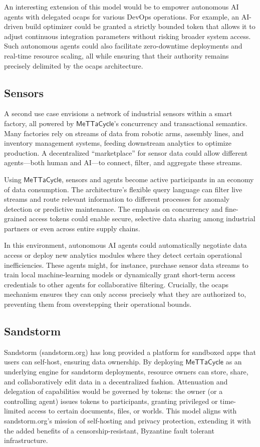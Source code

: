 \documentclass{article}
\newcommand{\MC}{\mathsf{MeTTaCycle}}
\begin{document}
An interesting extension of this model would be to empower autonomous AI agents with delegated ocaps for various DevOps operations. For example, an AI-driven build optimizer could be granted a strictly bounded token that allows it to adjust continuous integration parameters without risking broader system access. Such autonomous agents could also facilitate zero-downtime deployments and real-time resource scaling, all while ensuring that their authority remains precisely delimited by the ocaps architecture.

\subsection{Sensors}

A second use case envisions a network of industrial sensors within a smart factory, all powered by $\MC$'s concurrency and transactional semantics. Many factories rely on streams of data from robotic arms, assembly lines, and inventory management systems, feeding downstream analytics to optimize production. A decentralized “marketplace” for sensor data could allow different agents---both human and AI---to connect, filter, and aggregate these streams.

Using $\MC$, sensors and agents become active participants in an economy of data consumption. The architecture’s flexible query language can filter live streams and route relevant information to different processes for anomaly detection or predictive maintenance. The emphasis on concurrency and fine-grained access tokens could enable secure, selective data sharing among industrial partners or even across entire supply chains.

In this environment, autonomous AI agents could automatically negotiate data access or deploy new analytics modules where they detect certain operational inefficiencies. These agents might, for instance, purchase sensor data streams to train local machine-learning models or dynamically grant short-term access credentials to other agents for collaborative filtering. Crucially, the ocaps mechanism ensures they can only access precisely what they are authorized to, preventing them from overstepping their operational bounds.

\subsection{Sandstorm}

Sandstorm (sandstorm.org) has long provided a platform for sandboxed apps that users can self-host, ensuring data ownership. By deploying $\MC$ as an underlying engine for sandstorm deployments, resource owners can store, share, and collaboratively edit data in a decentralized fashion. Attenuation and delegation of capabilities would be governed by tokens: the owner (or a controlling agent) issues tokens to participants, granting privileged or time-limited access to certain documents, files, or worlds. This model aligns with sandstorm.org’s mission of self-hosting and privacy protection, extending it with the added benefits of a censorship-resistant, Byzantine fault tolerant infrastructure.
\end{document}
